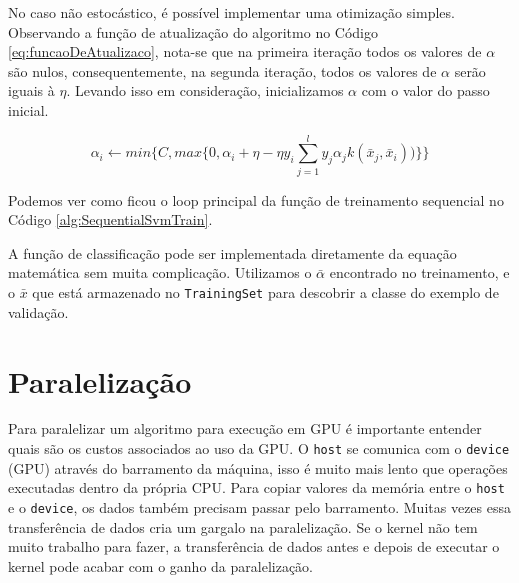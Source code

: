 No caso não estocástico, é possível implementar uma otimização simples.
Observando a função de atualização do algoritmo no Código \ref{eq:funcaoDeAtualizaco}, nota-se que na primeira iteração todos os valores de $\alpha$ são nulos, consequentemente, na segunda iteração, todos os valores de $\alpha$ serão iguais à $\eta$. Levando isso em consideração, inicializamos $\alpha$ com o valor do passo inicial.

\begin{equation}\label{eq:funcaoDeAtualizaco}
\alpha_i \leftarrow min\big\{C,max\big\{0,\alpha_i + \eta-\eta y_i \sum_{j=1}^l y_j \alpha_j k(\bar{x}_j,\bar{x}_i))\big\}\big\}
\end{equation}

Podemos ver como ficou o loop principal da função de treinamento sequencial no Código \ref{alg:SequentialSvmTrain}.


A função de classificação pode ser implementada diretamente da equação matemática sem muita complicação. Utilizamos o $\bar{\alpha}$ encontrado no treinamento, e o $\bar{x}$ que está armazenado no \texttt{TrainingSet} para descobrir a classe do exemplo de validação.


\section{Paralelização}

Para paralelizar um algoritmo para execução em GPU é importante entender quais são os custos associados ao uso da GPU. O \texttt{host} se comunica com o \texttt{device} (GPU) através do barramento da máquina, isso é muito mais lento que operações executadas dentro da própria CPU. 
Para copiar valores da memória entre o \texttt{host} e o \texttt{device}, os dados também precisam passar pelo barramento. 
Muitas vezes essa transferência de dados cria um gargalo na paralelização. Se o kernel não tem muito trabalho para fazer, a transferência de dados antes e depois de executar o kernel pode acabar com o ganho da paralelização.

